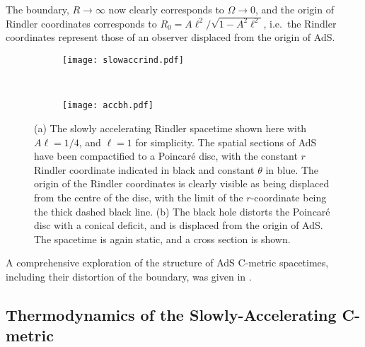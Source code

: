 \documentclass[
twoside,
openright,
frontopenright
]{dmathesis}
\begin{document}
The boundary, $R\to\infty$ now clearly corresponds to $\Omega\to 0$, 
and the origin of Rindler coordinates corresponds to
$R_0 = A \ell^2/\sqrt{1-A^2\ell^2}$, i.e.\ the Rindler coordinates represent
those of an observer displaced from the origin of AdS.
\begin{figure}
  \centering
  \begin{subfigure}[b]{0.5\textwidth}
    \texttt{[image: slowaccrind.pdf]}
    \caption{\label{fig:accbha}}
  \end{subfigure}~
  \begin{subfigure}[b]{0.4\textwidth}
    \texttt{[image: accbh.pdf]}
    \caption{\label{fig:accbh}}
  \end{subfigure}
  \caption{\label{fig:accbh}(a) The slowly accelerating Rindler spacetime shown
    here with $A\ell = 1/4$, and $\ell=1$ for simplicity. The spatial sections
    of AdS have been compactified to a Poincar\'e disc, with the constant $r$
    Rindler coordinate indicated in black and constant $\theta$ in blue. The
    origin of the Rindler coordinates is clearly visible as being displaced from
    the centre of the disc, with the limit of the $r$-coordinate being the thick
    dashed black line. (b) The black hole distorts the Poincar\'e disc with a
    conical deficit, and is displaced from the origin of AdS. The spacetime is
    again static, and a cross section is shown.}
\end{figure}

A comprehensive exploration of the structure of AdS C-metric spacetimes, 
including their distortion of the boundary, was given in \cite{Krtous:2005ej}.

\subsection{Thermodynamics of the Slowly-Accelerating C-metric}
\label{sec:cmet-TD-der}
\end{document}
